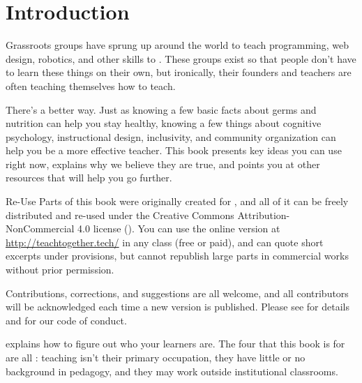 \chapter{Introduction}\label{s:intro}

Grassroots groups have sprung up around the world
to teach programming, web design, robotics, and other skills
to .
These groups exist so that people don't have to learn these things on their own,
but ironically,
their founders and teachers are often teaching themselves how to teach.

There's a better way.
Just as knowing a few basic facts about germs and nutrition can help you stay healthy,
knowing a few things about cognitive psychology,
instructional design,
inclusivity,
and community organization
can help you be a more effective teacher.
This book presents key ideas you can use right now,
explains why we believe they are true,
and points you at other resources that will help you go further.

\begin{aside}{Re-Use}
  Parts of this book were originally created for
  ,
  and all of it can be freely distributed and re-used
  under the Creative Commons Attribution-NonCommercial 4.0 license
  ().
  You can use the online version at \url{http://teachtogether.tech/} in any class
  (free or paid),
  and can quote short excerpts under  provisions,
  but cannot republish large parts in commercial works without prior permission.

  Contributions, corrections, and suggestions are all welcome,
  and all contributors will be acknowledged each time a new version is published.
  Please see  for details
  and  for our code of conduct.
\end{aside}


 explains how to figure out who your learners are.
The four that this book is for are all :
teaching isn't their primary occupation,
they have little or no background in pedagogy,
and they may work outside institutional classrooms.

